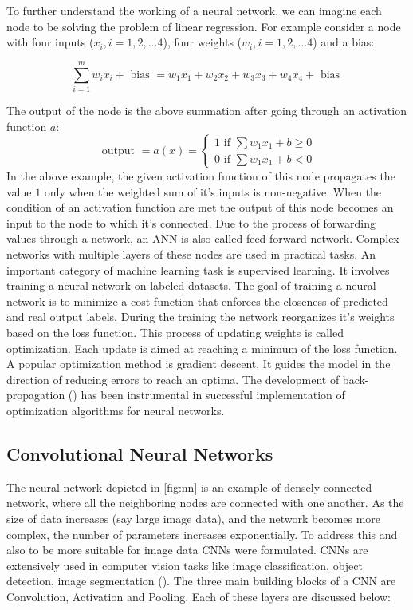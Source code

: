 To further understand the working of a neural network, we can imagine each node to be solving the problem of linear regression. For example consider a node with four inputs ($x_i, i=1,2,\dots4$), four weights ($w_i, i=1,2,\dots4$) and a bias:

\begin{equation}
\sum_{i=1}^{m} w_{i} x_{i}+\text { bias }=w_{1} x_{1}+w_{2} x_{2}+w_{3} x_{3}+w_{4} x_{4}+\text { bias }
\end{equation}

The output of the node is the above summation after going through an activation function $a$:
\begin{equation}
\text { output }=a(x)=\left\{\begin{array}{l}
1 \text { if } \sum w_{1} x_{1}+b \geq 0 \\
0 \text { if } \sum w_{1} x_{1}+b<0
\end{array}\right.
\end{equation}
In the above example, the given activation function of this node propagates the value $1$ only when the weighted sum of it's inputs is non-negative. When the condition of an activation function are met the output of this node becomes an input to the node to which it's connected. Due to the process of forwarding values through a network, an \ac{ANN} is also called feed-forward network. Complex networks with multiple layers of these nodes are used in practical tasks. An important category of machine learning task is supervised learning. It involves training a neural network on labeled datasets. The goal of training a neural network is to minimize a cost function that enforces the closeness of predicted and real output labels. During the training the network reorganizes it's weights based on the loss function. This process of updating weights is called optimization. Each update is aimed at reaching a minimum of the loss function. A popular optimization method is gradient descent. It guides the model in the direction of reducing errors to reach an optima. The development of back-propagation (\cite{rumelhart1986learning}) has been instrumental in successful implementation of optimization algorithms for neural networks.  


\subsection{Convolutional Neural Networks}

The neural network depicted in \ref{fig:nn} is an example of densely connected network, where all the neighboring nodes are connected with one another. As the size of data increases (say large image data), and the network becomes more complex, the number of parameters increases exponentially. To address this and also to be more suitable for image data \ac{CNN}s were formulated. \ac{CNN}s are extensively used in computer vision tasks like image classification, object detection, image segmentation (\cite{voulodimos2018deep}). The three main building blocks of a \ac{CNN} are Convolution, Activation and Pooling. Each of these layers are discussed below:


